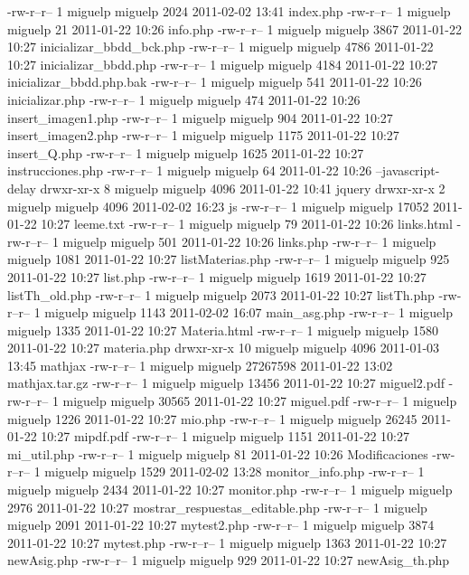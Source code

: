 -rw-r--r--  1 miguelp miguelp     2024 2011-02-02 13:41 index.php
-rw-r--r--  1 miguelp miguelp       21 2011-01-22 10:26 info.php
-rw-r--r--  1 miguelp miguelp     3867 2011-01-22 10:27 inicializar_bbdd_bck.php
-rw-r--r--  1 miguelp miguelp     4786 2011-01-22 10:27 inicializar_bbdd.php
-rw-r--r--  1 miguelp miguelp     4184 2011-01-22 10:27 inicializar_bbdd.php.bak
-rw-r--r--  1 miguelp miguelp      541 2011-01-22 10:26 inicializar.php
-rw-r--r--  1 miguelp miguelp      474 2011-01-22 10:26 insert_imagen1.php
-rw-r--r--  1 miguelp miguelp      904 2011-01-22 10:27 insert_imagen2.php
-rw-r--r--  1 miguelp miguelp     1175 2011-01-22 10:27 insert_Q.php
-rw-r--r--  1 miguelp miguelp     1625 2011-01-22 10:27 instrucciones.php
-rw-r--r--  1 miguelp miguelp       64 2011-01-22 10:26 --javascript-delay
drwxr-xr-x  8 miguelp miguelp     4096 2011-01-22 10:41 jquery
drwxr-xr-x  2 miguelp miguelp     4096 2011-02-02 16:23 js
-rw-r--r--  1 miguelp miguelp    17052 2011-01-22 10:27 leeme.txt
-rw-r--r--  1 miguelp miguelp       79 2011-01-22 10:26 links.html
-rw-r--r--  1 miguelp miguelp      501 2011-01-22 10:26 links.php
-rw-r--r--  1 miguelp miguelp     1081 2011-01-22 10:27 listMaterias.php
-rw-r--r--  1 miguelp miguelp      925 2011-01-22 10:27 list.php
-rw-r--r--  1 miguelp miguelp     1619 2011-01-22 10:27 listTh_old.php
-rw-r--r--  1 miguelp miguelp     2073 2011-01-22 10:27 listTh.php
-rw-r--r--  1 miguelp miguelp     1143 2011-02-02 16:07 main_asg.php
-rw-r--r--  1 miguelp miguelp     1335 2011-01-22 10:27 Materia.html
-rw-r--r--  1 miguelp miguelp     1580 2011-01-22 10:27 materia.php
drwxr-xr-x 10 miguelp miguelp     4096 2011-01-03 13:45 mathjax
-rw-r--r--  1 miguelp miguelp 27267598 2011-01-22 13:02 mathjax.tar.gz
-rw-r--r--  1 miguelp miguelp    13456 2011-01-22 10:27 miguel2.pdf
-rw-r--r--  1 miguelp miguelp    30565 2011-01-22 10:27 miguel.pdf
-rw-r--r--  1 miguelp miguelp     1226 2011-01-22 10:27 mio.php
-rw-r--r--  1 miguelp miguelp    26245 2011-01-22 10:27 mipdf.pdf
-rw-r--r--  1 miguelp miguelp     1151 2011-01-22 10:27 mi_util.php
-rw-r--r--  1 miguelp miguelp       81 2011-01-22 10:26 Modificaciones
-rw-r--r--  1 miguelp miguelp     1529 2011-02-02 13:28 monitor_info.php
-rw-r--r--  1 miguelp miguelp     2434 2011-01-22 10:27 monitor.php
-rw-r--r--  1 miguelp miguelp     2976 2011-01-22 10:27 mostrar_respuestas_editable.php
-rw-r--r--  1 miguelp miguelp     2091 2011-01-22 10:27 mytest2.php
-rw-r--r--  1 miguelp miguelp     3874 2011-01-22 10:27 mytest.php
-rw-r--r--  1 miguelp miguelp     1363 2011-01-22 10:27 newAsig.php
-rw-r--r--  1 miguelp miguelp      929 2011-01-22 10:27 newAsig_th.php
